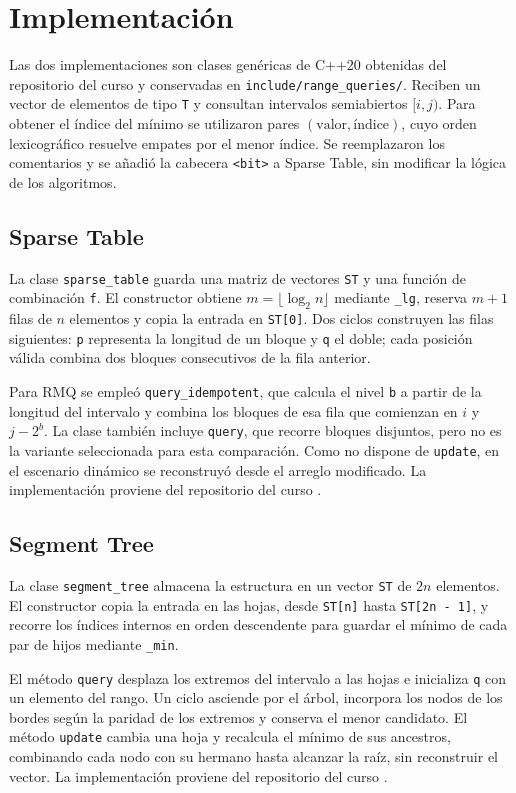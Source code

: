\section{Implementación}

Las dos implementaciones son clases genéricas de C++20 obtenidas del
repositorio del curso y conservadas en \texttt{include/range\_queries/}.
Reciben un vector de elementos de tipo \texttt{T} y consultan intervalos
semiabiertos \([i,j)\). Para obtener el índice del mínimo se utilizaron pares
\((\text{valor},\text{índice})\), cuyo orden lexicográfico resuelve empates
por el menor índice. Se reemplazaron los comentarios y se añadió la cabecera
\texttt{<bit>} a Sparse Table, sin modificar la lógica de los algoritmos.

\subsection{Sparse Table}

La clase \texttt{sparse\_table} guarda una matriz de vectores \texttt{ST}
y una función de combinación \texttt{f}. El constructor obtiene
\(m=\lfloor\log_2 n\rfloor\) mediante \texttt{\_lg}, reserva \(m+1\)
filas de \(n\) elementos y copia la entrada en \texttt{ST[0]}. Dos ciclos
construyen las filas siguientes: \texttt{p} representa la longitud de un
bloque y \texttt{q} el doble; cada posición válida combina dos bloques
consecutivos de la fila anterior.

Para RMQ se empleó \texttt{query\_idempotent}, que calcula el nivel
\texttt{b} a partir de la longitud del intervalo y combina los bloques
de esa fila que comienzan en \(i\) y \(j-2^b\). La clase también
incluye \texttt{query}, que recorre bloques disjuntos, pero no es la variante
seleccionada para esta comparación. Como no dispone de \texttt{update},
en el escenario dinámico se reconstruyó desde el arreglo modificado.
La implementación proviene del repositorio del curso \cite{edaa-sparse-table}.

\subsection{Segment Tree}

La clase \texttt{segment\_tree} almacena la estructura en un vector
\texttt{ST} de \(2n\) elementos. El constructor copia la entrada en las
hojas, desde \texttt{ST[n]} hasta \texttt{ST[2n - 1]}, y recorre los
índices internos en orden descendente para guardar el mínimo de cada par
de hijos mediante \texttt{\_min}.

El método \texttt{query} desplaza los extremos del intervalo a las hojas e
inicializa \texttt{q} con un elemento del rango. Un ciclo asciende por el
árbol, incorpora los nodos de los bordes según la paridad de los extremos
y conserva el menor candidato. El método \texttt{update} cambia una hoja
y recalcula el mínimo de sus ancestros, combinando cada nodo con su hermano
hasta alcanzar la raíz, sin reconstruir el vector.
La implementación proviene del repositorio del curso \cite{edaa-segment-tree}.
